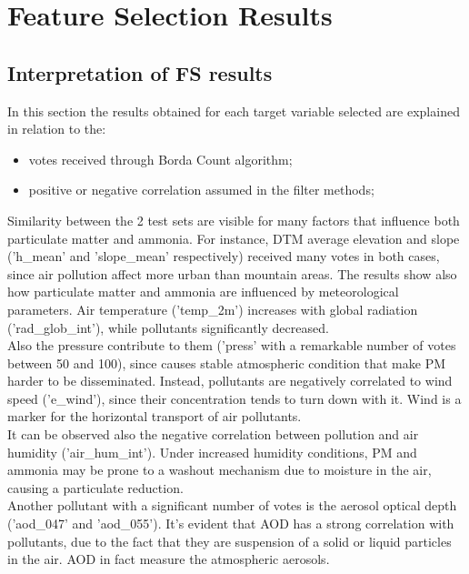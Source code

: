
\section{Feature Selection Results}
\subsection{Interpretation of FS results}
In this section the results obtained for each target variable selected are explained in relation to the:
\begin{itemize}
    \item votes received through Borda Count algorithm;
    \item positive or negative correlation assumed in the filter methods;
\end{itemize}
Similarity between the 2 test sets are visible for many factors that influence both particulate matter and ammonia.
For instance, DTM average elevation and slope ('h\_mean' and 'slope\_mean' respectively) received many votes in both cases, since air pollution affect more urban than mountain areas.
The results show also how particulate matter and ammonia are influenced by meteorological parameters.
Air temperature ('temp\_2m') increases with global radiation ('rad\_glob\_int'), while pollutants significantly decreased\cite{li2015particulate}. \\
Also the pressure contribute to them ('press' with a remarkable number of votes between 50 and 100), since causes stable atmospheric condition that make PM harder to be disseminated. 
Instead, pollutants are negatively correlated to wind speed ('e\_wind'), since their concentration tends to turn down with it. Wind is a marker for the horizontal transport of air pollutants.\\
It can be observed also the negative correlation between pollution and air humidity ('air\_hum\_int').
Under increased humidity conditions, PM and ammonia may be prone to a washout mechanism due to moisture in the air, causing a particulate reduction\cite{biglari2017relationship}.\\
Another pollutant with a significant number of votes is the aerosol optical depth ('aod\_047' and 'aod\_055'). It's evident that AOD has a strong correlation with pollutants, due to the fact that they are suspension of a solid or liquid particles in the air. AOD in fact measure the atmospheric aerosols.
